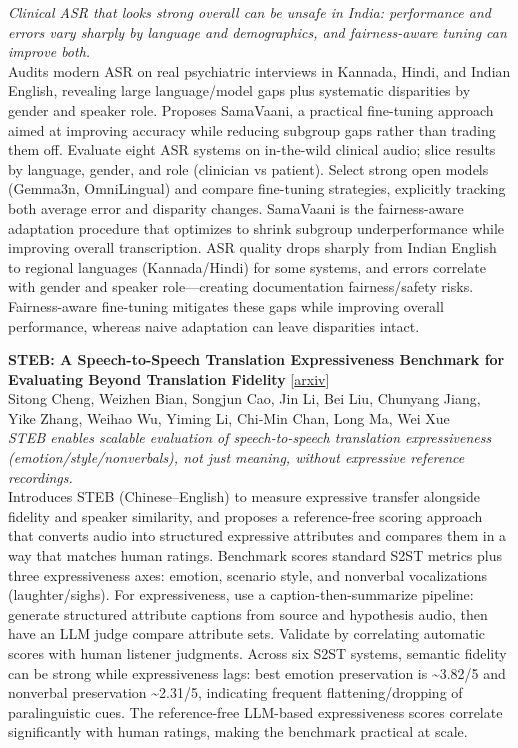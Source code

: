 \documentclass[12pt,letterpaper]{article}
\begin{document}
{\small\textit{Clinical ASR that looks strong overall can be unsafe in India: performance and errors vary sharply by language and demographics, and fairness-aware tuning can improve both.}}\\[1pt]
{\footnotesize Audits modern ASR on real psychiatric interviews in Kannada, Hindi, and Indian English, revealing large language/model gaps plus systematic disparities by gender and speaker role. Proposes SamaVaani, a practical fine-tuning approach aimed at improving accuracy while reducing subgroup gaps rather than trading them off. Evaluate eight ASR systems on in-the-wild clinical audio; slice results by language, gender, and role (clinician vs patient). Select strong open models (Gemma3n, OmniLingual) and compare fine-tuning strategies, explicitly tracking both average error and disparity changes. SamaVaani is the fairness-aware adaptation procedure that optimizes to shrink subgroup underperformance while improving overall transcription. ASR quality drops sharply from Indian English to regional languages (Kannada/Hindi) for some systems, and errors correlate with gender and speaker role---creating documentation fairness/safety risks. Fairness-aware fine-tuning mitigates these gaps while improving overall performance, whereas naive adaptation can leave disparities intact.}

\medskip

{\small\textbf{STEB: A Speech-to-Speech Translation Expressiveness Benchmark for Evaluating Beyond Translation Fidelity}} {\scriptsize[\href{https://arxiv.org/abs/2606.25529}{arxiv}]}\\
{\scriptsize Sitong Cheng, Weizhen Bian, Songjun Cao, Jin Li, Bei Liu, Chunyang Jiang, Yike Zhang, Weihao Wu, Yiming Li, Chi-Min Chan, Long Ma, Wei Xue}\\

{\small\textit{STEB enables scalable evaluation of speech-to-speech translation expressiveness (emotion/style/nonverbals), not just meaning, without expressive reference recordings.}}\\[1pt]
{\footnotesize Introduces STEB (Chinese--English) to measure expressive transfer alongside fidelity and speaker similarity, and proposes a reference-free scoring approach that converts audio into structured expressive attributes and compares them in a way that matches human ratings. Benchmark scores standard S2ST metrics plus three expressiveness axes: emotion, scenario style, and nonverbal vocalizations (laughter/sighs). For expressiveness, use a caption-then-summarize pipeline: generate structured attribute captions from source and hypothesis audio, then have an LLM judge compare attribute sets. Validate by correlating automatic scores with human listener judgments. Across six S2ST systems, semantic fidelity can be strong while expressiveness lags: best emotion preservation is \textasciitilde{}3.82/5 and nonverbal preservation \textasciitilde{}2.31/5, indicating frequent flattening/dropping of paralinguistic cues. The reference-free LLM-based expressiveness scores correlate significantly with human ratings, making the benchmark practical at scale.}
\end{document}
